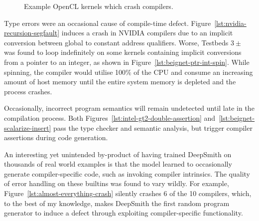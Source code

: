 \begin{figure}
  \centering %
  \\%
  \\%
  \\%
  \\%
  \\%
  \caption[Example OpenCL kernels which crash compilers]{%
    Example OpenCL kernels which crash compilers.%
  }%
\end{figure}

Type errors were an occasional cause of compile-time defect. Figure~\ref{lst:nvidia-recursion-segfault} induces a crash in NVIDIA compilers due to an implicit conversion between global to constant address qualifiers. Worse, Testbeds $3\pm$ was found to loop indefinitely on some kernels containing implicit conversions from a pointer to an integer, as shown in Figure~\ref{lst:beignet-ptr-int-spin}. While spinning, the compiler would utilise 100\% of the CPU and consume an increasing amount of host memory until the entire system memory is depleted and the process crashes.

Occasionally, incorrect program semantics will remain undetected until late in the compilation process. Both Figures~\ref{lst:intel-gt2-double-assertion} and~\ref{lst:beignet-scalarize-insert} pass the type checker and semantic analysis, but trigger compiler assertions during code generation.

An interesting yet unintended by-product of having trained DeepSmith on thousands of real world examples is that the model learned to occasionally generate compiler-specific code, such as invoking compiler intrinsics. The quality of error handling on these builtins was found to vary wildly. For example, Figure~\ref{lst:almost-everything-crash} silently crashes 6 of the 10 compilers, which, to the best of my knowledge, makes DeepSmith the first random program generator to induce a defect through exploiting compiler-specific functionality.

